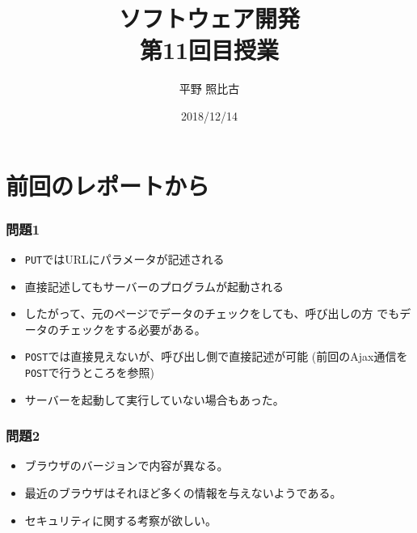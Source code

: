 
\title{ソフトウェア開発\\第11回目授業}
\author{平野 照比古}
\institute{}
\date{2018/12/14}
\newtheorem{Prob}{解説}
\newcommand{\Elm}[1]{\texttt{<#1>}}

\newcommand{\DOMM}{\texttt}
\newcommand{\Event}{\texttt}
\newcommand{\DOMP}{\texttt}
\newcommand{\DOM}{\texttt{DOM}}
\newcommand{\keyitem}{\relax}
\newcommand{\HTML}{HTML文書}

\frame{\maketitle}
\section{前回のレポートから}
 \begin{frame}[containsverbatim]
  \frametitle{問題1}
  \begin{itemize}
   \item \texttt{PUT}ではURLにパラメータが記述される
   \item 直接記述してもサーバーのプログラムが起動される
   \item したがって、元のページでデータのチェックをしても、呼び出しの方
         でもデータのチェックをする必要がある。
   \item \texttt{POST}では直接見えないが、呼び出し側で直接記述が可能
         (前回のAjax通信を\texttt{POST}で行うところを参照)
   \item サーバーを起動して実行していない場合もあった。
  \end{itemize}
 \end{frame}
 \begin{frame}[containsverbatim]
  \frametitle{問題2}
  \begin{itemize}
   \item ブラウザのバージョンで内容が異なる。
   \item 最近のブラウザはそれほど多くの情報を与えないようである。
   \item セキュリティに関する考察が欲しい。
  \end{itemize}
 \end{frame}
 \iffalse
